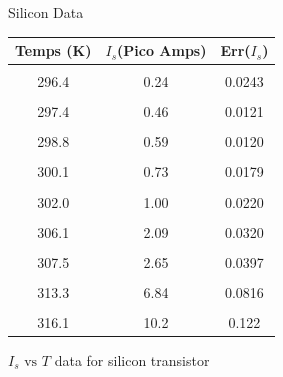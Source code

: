 \documentclass[12pt,letterpaper,twocolumn]{article}
\begin{document}
\begin {table}[H]
\caption*{Silicon Data}
{\footnotesize
\begin {center}
\begin {tabular} {|c | c | c| }
\hline
Temps (K) 			&    $I_s$(Pico Amps) & Err($I_s$)\\
\hline  &&\\
296.4   & 0.24 & 0.0243\\
\hline  && \\
297.4   & 0.46 & 0.0121\\
\hline  & &\\
298.8   &0.59  & 0.0120\\
\hline  && \\
300.1   &0.73  &  0.0179\\
\hline  & &\\
302.0   &1.00  & 0.0220\\
\hline  & &\\
306.1   &2.09  &  0.0320\\
\hline  & &\\
307.5   &2.65  &  0.0397\\
\hline  & &\\
313.3   &6.84  &  0.0816\\
\hline  & &\\
316.1	&10.2  & 0.122\\
\hline%
\end {tabular}
\end {center}
\caption{\label{tab1} $I_s \text{ vs } T$ data for silicon transistor}
}
\end{table}
\end{document}
